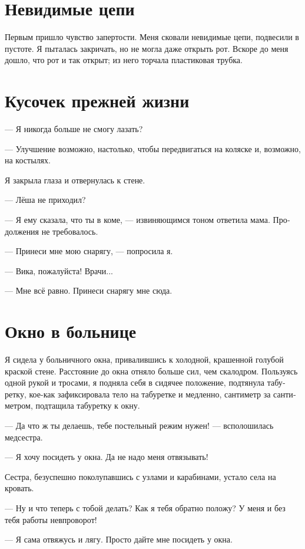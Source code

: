 \documentclass[a4paper,12pt,fleqn]{book}\usepackage{polyglossia}\setdefaultlanguage[babelshorthands=true]{russian}\setotherlanguage{english}\defaultfontfeatures{Ligatures=TeX,Mapping=tex-text}\usepackage{xcolor}\newcommand{\ml}[3]{#2}
\begin{document}
\section{Невидимые цепи}

Первым пришло чувство запертости.
Меня сковали невидимые цепи, подвесили в пустоте.
Я пыталась закричать, но не могла даже открыть рот.
Вскоре до меня дошло, что рот и так открыт;
из него торчала пластиковая трубка.

\section{Кусочек прежней жизни}

--- Я никогда больше не смогу лазать?

--- Улучшение возможно, настолько, чтобы передвигаться на коляске и, возможно, на костылях.

Я закрыла глаза и отвернулась к стене.

--- Лёша не приходил?

--- Я ему сказала, что ты в коме, --- извиняющимся тоном ответила мама.
Продолжения не требовалось.

--- Принеси мне мою снарягу, --- попросила я.

--- Вика, пожалуйста!
Врачи...

--- Мне всё равно.
Принеси снарягу мне сюда.

\section{Окно в больнице}

Я сидела у больничного окна, привалившись к холодной, крашенной голубой краской стене.
Расстояние до окна отняло больше сил, чем скалодром.
Пользуясь одной рукой и тросами, я подняла себя в сидячее положение, подтянула табуретку, кое-как зафиксировала тело на табуретке и медленно, сантиметр за сантиметром, подтащила табуретку к окну.

--- Да что ж ты делаешь, тебе постельный режим нужен! --- всполошилась медсестра.

--- Я хочу посидеть у окна.
Да не надо меня отвязывать!

Сестра, безуспешно поколупавшись с узлами и карабинами, устало села на кровать.

--- Ну и что теперь с тобой делать?
Как я тебя обратно положу?
У меня и без тебя работы невпроворот!

--- Я сама отвяжусь и лягу.
Просто дайте мне посидеть у окна.
\end{document}
